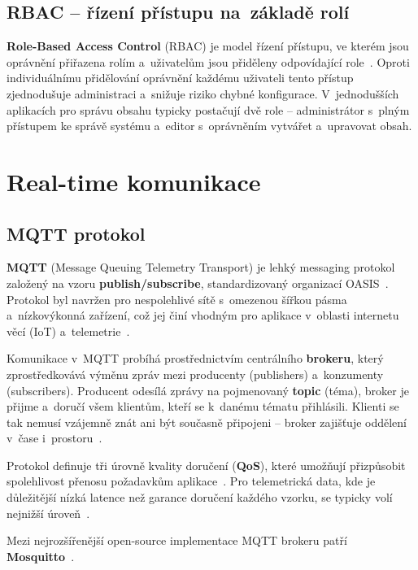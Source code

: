 \subsection{RBAC -- řízení přístupu na~základě rolí}

\textbf{Role-Based Access Control} (RBAC) je model řízení přístupu, ve kterém jsou oprávnění přiřazena rolím a~uživatelům jsou přiděleny odpovídající role~\cite{sandhu1996rbac}. Oproti individuálnímu přidělování oprávnění každému uživateli tento přístup zjednodušuje administraci a~snižuje riziko chybné konfigurace. V~jednodušších aplikacích pro správu obsahu typicky postačují dvě role -- administrátor s~plným přístupem ke správě systému a~editor s~oprávněním vytvářet a~upravovat obsah.

\section{Real-time komunikace}

\subsection{MQTT protokol}

\textbf{MQTT} (Message Queuing Telemetry Transport) je lehký messaging protokol založený na vzoru \textbf{publish/subscribe}, standardizovaný organizací OASIS~\cite{mqtt2014oasis}. Protokol byl navržen pro nespolehlivé sítě s~omezenou šířkou pásma a~nízkovýkonná zařízení, což jej činí vhodným pro aplikace v~oblasti internetu věcí (IoT) a~telemetrie~\cite{mishra2020mqtt}.

Komunikace v~MQTT probíhá prostřednictvím centrálního \textbf{brokeru}, který zprostředkovává výměnu zpráv mezi producenty (publishers) a~konzumenty (subscribers). Producent odesílá zprávy na pojmenovaný \textbf{topic} (téma), broker je přijme a~doručí všem klientům, kteří se k~danému tématu přihlásili. Klienti se tak nemusí vzájemně znát ani být současně připojeni -- broker zajišťuje oddělení v~čase i~prostoru~\cite{quincozes2019mqtt}.

Protokol definuje tři úrovně kvality doručení (\textbf{QoS}), které umožňují přizpůsobit spolehlivost přenosu požadavkům aplikace~\cite{mqtt2014oasis}. Pro telemetrická data, kde je důležitější nízká latence než garance doručení každého vzorku, se typicky volí nejnižší úroveň~\cite{kegenbekov2022mqtt}.

\begin{sloppypar}
Mezi nejrozšířenější open-source implementace MQTT brokeru patří \textbf{Mosquitto}~\cite{light2017mosquitto}.
\end{sloppypar}


